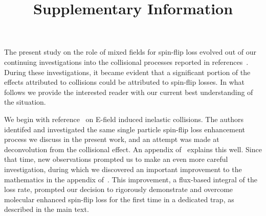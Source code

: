 \documentclass[%
 reprint,
 amsmath,amssymb,
 aps,
prl,
]{revtex4-1}
\begin{document}

\title{Supplementary Information}%







\maketitle



The present study on the role of mixed fields for spin-flip loss evolved out of our continuing investigations into the collisional processes reported in references~\cite{Stuhl2012evap,Stuhl2013}.
During these investigations, it became evident that a significant portion of the effects attributed to collisions could be attributed to spin-flip losses.
In what follows we provide the interested reader with our current best understanding of the situation.

We begin with reference~\cite{Stuhl2013} on E-field induced inelastic collisions. 
The authors identifed and investigated the same single particle spin-flip loss enhancement process we discuss in the present work, and an attempt was made at deconvolution from the collisional effect. 
An appendix of~\cite{Stuhl2013} explains this well.
Since that time, new observations prompted us to make an even more careful investigation, during which we discovered an important improvement to the mathematics in the appendix of~\cite{Stuhl2013}.
This improvement, a flux-based integral of the loss rate, prompted our decision to rigorously demonstrate and overcome molecular enhanced spin-flip loss for the first time in a dedicated trap, as described in the main text.
\end{document}
